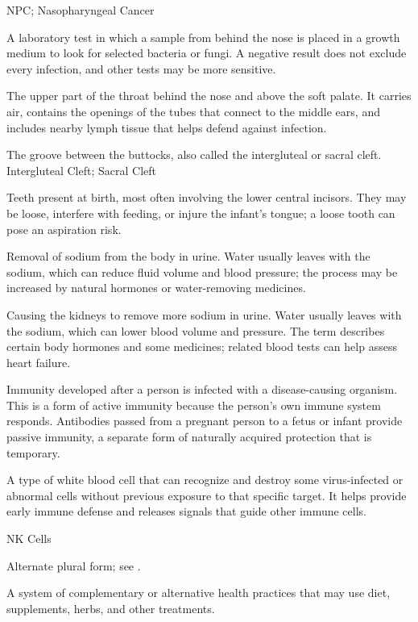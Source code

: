 \synonyms
NPC; Nasopharyngeal Cancer

 A laboratory test in which a sample from behind the nose is placed in a growth medium to look for selected bacteria or fungi. A negative result does not exclude every infection, and other tests may be more sensitive.

 The upper part of the throat behind the nose and above the soft palate. It carries air, contains the openings of the tubes that connect to the middle ears, and includes nearby lymph tissue that helps defend against infection.

 The groove between the buttocks, also called the intergluteal or sacral cleft.
\synonyms
Intergluteal Cleft; Sacral Cleft

 Teeth present at birth, most often involving the lower central incisors. They may be
loose, interfere with feeding, or injure the infant's tongue; a loose tooth can pose
an aspiration risk.

 Removal of sodium from the body in urine. Water usually leaves with the sodium, which can reduce fluid volume and blood pressure; the process may be increased by natural hormones or water-removing medicines.

 Causing the kidneys to remove more sodium in urine. Water usually leaves with the sodium, which can lower blood volume and pressure. The term describes certain body hormones and some medicines; related blood tests can help assess heart failure.

 Immunity developed after a person is infected with a disease-causing organism. This is a form of active immunity because the person's own immune system responds. Antibodies passed from a pregnant person to a fetus or infant provide passive immunity, a separate form of naturally acquired protection that is temporary.

 A type of white blood cell that can recognize and destroy some virus-infected or abnormal cells without previous exposure to that specific target. It helps provide early immune defense and releases signals that guide other immune cells.

\synonyms
NK Cells

 Alternate plural form; see .

 A system of complementary or alternative health practices that may use diet, supplements, herbs, and other treatments.

